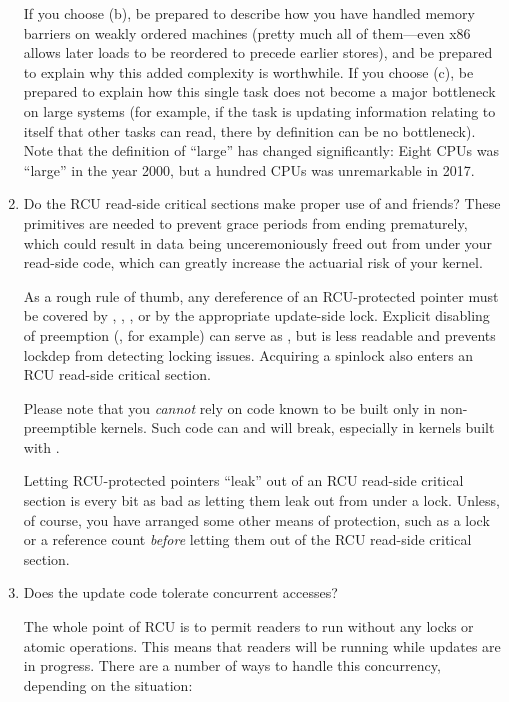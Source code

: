 \begin{enumerate}[start=0]
	If you choose (b), be prepared to describe how you have handled
	memory barriers on weakly ordered machines (pretty much all of
	them---even x86 allows later loads to be reordered to precede
	earlier stores), and be prepared to explain why this added
	complexity is worthwhile.
	If you choose (c), be prepared to
	explain how this single task does not become a major bottleneck
	on large systems (for example, if the task is updating information
	relating to itself that other tasks can read, there by definition
	can be no bottleneck).
	Note that the definition of ``large'' has
	changed significantly:
	Eight CPUs was ``large'' in the year 2000,
	but a hundred CPUs was unremarkable in 2017.

\item	Do the RCU read-side critical sections make proper use of
	 and friends?
	These primitives are needed
	to prevent grace periods from ending prematurely, which
	could result in data being unceremoniously freed out from
	under your read-side code, which can greatly increase the
	actuarial risk of your kernel.

	As a rough rule of thumb, any dereference of an RCU-protected
	pointer must be covered by , ,
	, or by the appropriate update-side lock.
	Explicit disabling of preemption (, for example)
	can serve as , but is less readable and
	prevents lockdep from detecting locking issues.
	Acquiring a
	spinlock also enters an RCU read-side critical section.

	Please note that you \emph{cannot} rely on code known to be built
	only in non-preemptible kernels.
	Such code can and will break,
	especially in kernels built with .

	Letting RCU-protected pointers ``leak'' out of an RCU read-side
	critical section is every bit as bad as letting them leak out
	from under a lock.
	Unless, of course, you have arranged some
	other means of protection, such as a lock or a reference count
	\emph{before} letting them out of the RCU read-side critical section.

\item	Does the update code tolerate concurrent accesses?

	The whole point of RCU is to permit readers to run without
	any locks or atomic operations.
	This means that readers will
	be running while updates are in progress.
	There are a number
	of ways to handle this concurrency, depending on the situation:


\end{enumerate}
